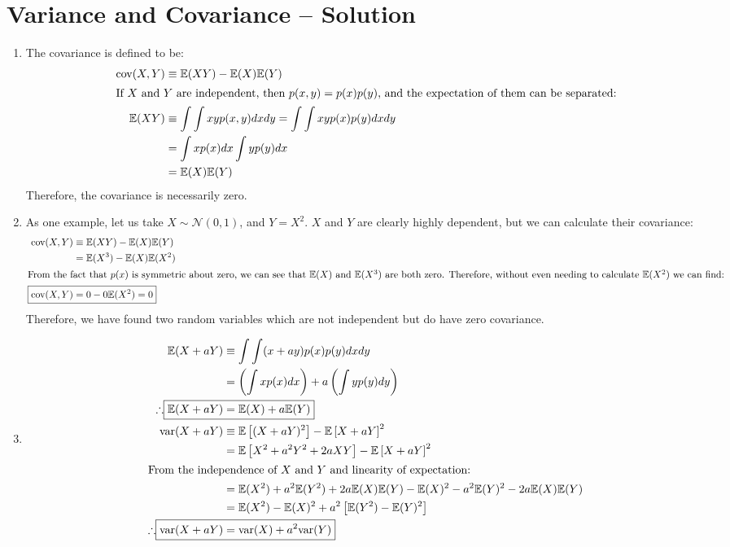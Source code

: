 \documentclass[submit]{harvardml}
\newcommand{\E}{\mathbb{E}}
\newcommand{\cov}{\text{cov}}
\begin{document}
\section*{Variance and Covariance -- Solution}
\begin{enumerate}[label=(\alph*)]
\item The covariance is defined to be:
  \begin{align*}
    \cov(X,Y) &\equiv \E(XY) - \E(X)\E(Y)\\ \intertext{If $X$ and $Y$
      are independent, then $p(x,y) = p(x)p(y)$, and the expectation
      of them can be separated:} \E(XY) &\equiv \int\int x y p(x,y) dx
    dy = \int\int x y p(x) p(y) dx dy\\
    &= \int xp(x)dx \int yp(y) dx\\
    &= \E(X)\E(Y)\\
  \end{align*}
  Therefore, the covariance is necessarily zero.
  
\item
  As one example, let us take $X\sim\mathcal{N}(0,1)$, and
  $Y=X^2$. $X$ and $Y$ are clearly highly dependent, but we can
  calculate their covariance:
  \begin{align*}
    \cov(X,Y) &\equiv \E(XY) - \E(X)\E(Y)\\
    &= \E(X^3) - \E(X)\E(X^2)\\
    \intertext{From the fact that $p(x)$ is symmetric about zero, we
      can see that $\E(X)$ and $\E(X^3)$ are both
      zero. Therefore, without even needing to calculate $\E(X^2)$ we
      can find:}
    \Aboxed{\cov(X,Y) &= 0 - 0\E(X^2) = 0}
  \end{align*}
  Therefore, we have found two random variables which are not
  independent but do have zero covariance.
  
\item
  \begin{align*}
    \E(X + aY) &\equiv \int\int (x+ay) p(x)p(y) dx dy\\
    &= \left(\int x p(x) dx\right) +a\left(\int y p(y) dy\right)\\
    \therefore \Aboxed{\E(X+aY)&= \E(X) + a \E(Y)}\\
    \var(X + aY) &\equiv \E\left[(X + aY)^2\right] - \E\left[X +
      aY\right]^2\\
    &= \E\left[X^2 + a^2Y^2 + 2aXY\right] - \E\left[X + aY\right]^2\\
    \intertext{From the independence of $X$ and $Y$ and linearity of
      expectation:}
    &= \E(X^2) + a^2\E(Y^2) + 2a\E(X)\E(Y) - \E(X)^2 - a^2\E(Y)^2 -
    2a\E(X)\E(Y)\\
    &= \E(X^2)-\E(X)^2 + a^2\left[\E(Y^2) - \E(Y)^2\right]\\
    \therefore \Aboxed{\var(X + aY) &= \var(X) + a^2\var(Y)}
  \end{align*}
\end{enumerate}
\end{document}
